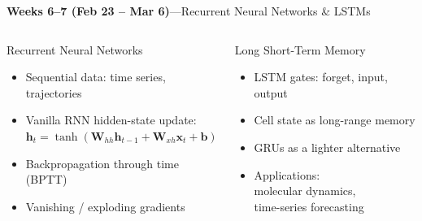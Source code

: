 \documentclass[aspectratio=169,11pt]{beamer}
\begin{document}
\begin{frame}{{\color{mlgold}\textbf{Weeks 6--7 (Feb 23 -- Mar 6)}\;---\;Recurrent Neural Networks \& LSTMs}}
  \begin{columns}[T]
      \begin{block}{Recurrent Neural Networks}
        \begin{itemize}\itemsep1pt
          \item Sequential data: time series, trajectories
          \item Vanilla RNN hidden-state update:\\
                $\bm{h}_t = \tanh(\bm{W}_{hh}\bm{h}_{t-1}
                            +\bm{W}_{xh}\bm{x}_t+\bm{b})$
          \item Backpropagation through time (BPTT)
          \item Vanishing / exploding gradients
        \end{itemize}
      \end{block}
      \begin{block}{Long Short-Term Memory}
        \begin{itemize}\itemsep1pt
          \item LSTM gates: forget, input, output
          \item Cell state as long-range memory
          \item GRUs as a lighter alternative
          \item Applications:\\
                molecular dynamics,\\
                time-series forecasting
        \end{itemize}
      \end{block}
  \end{columns}
\end{frame}
\end{document}
